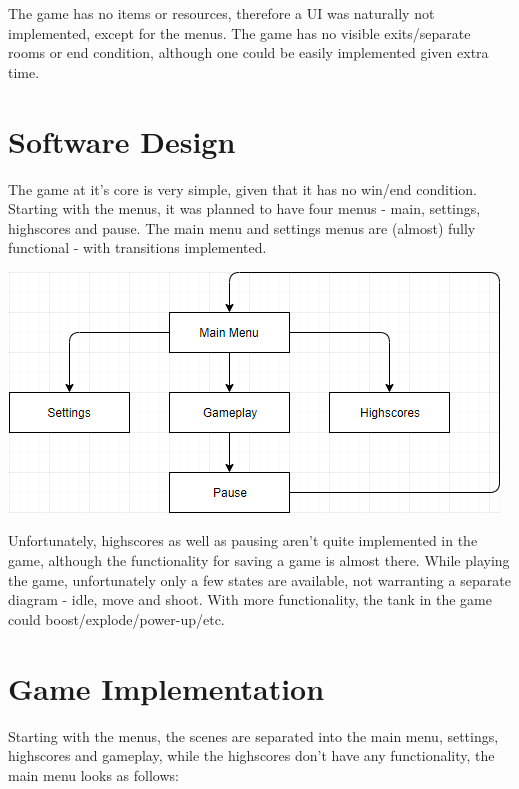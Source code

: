 \documentclass[12pt]{article}
\begin{document}
The game has no items or resources, therefore a UI was naturally not implemented, except for the menus. The game has no visible exits/separate rooms or end condition, although one could be easily implemented given extra time.

\clearpage

\section{Software Design}

The game at it's core is very simple, given that it has no win/end condition. Starting with the menus, it was planned to have four menus - main, settings, highscores and pause. The main menu and settings menus are (almost) fully functional - with transitions implemented. \newline

\includegraphics[width=\textwidth,height=\textheight,keepaspectratio]{MenuState}

\hspace{1cm}

Unfortunately, highscores as well as pausing aren't quite implemented in the game, although the functionality for saving a game is almost there. While playing the game, unfortunately only a few states are available, not warranting a separate diagram - idle, move and shoot. With more functionality, the tank in the game could boost/explode/power-up/etc.

\clearpage

\section{Game Implementation}

Starting with the menus, the scenes are separated into the main menu, settings, highscores and gameplay, while the highscores don't have any functionality, the main menu looks as follows:
\end{document}

